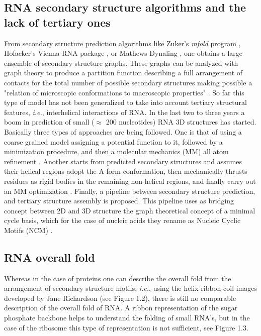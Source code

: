 \subsection{RNA secondary structure algorithms and the lack of
tertiary  ones} From  secondary structure  prediction  algorithms like
Zuker's \textit{mfold} program \cite{zuker2003}, Hofacker's Vienna RNA
package  \cite{hofacker1994}, or Mathews  Dynaling \cite{mathews2002},
one  obtains a large  ensemble of  secondary structure  graphs.  These
graphs  can be  analyzed  with  graph theory  to  produce a  partition
function  describing a  full  arrangement of  contacts  for the  total
number of possible secondary structures making possible a "relation of
microscopic      conformations     to      macroscopic     properties"
\cite{chen2000}. So far this type of model has not been generalized to
take  into   account  tertiary  structural   features,  \textit{i.e.},
interhelical interactions of RNA.
In the  last two to  three years a
boom  in  prediction  of  small  ($\approx$  200  nucleotides)  RNA  3D
structures has started. Basically  three types of approaches are being
followed.  One is that  of using  a coarse  grained model  assigning a
potential function  to it, followed  by a minimization  procedure, and
then  a molecular  mechanics (MM)  all atom  refinement \cite{das2007,
  ding2008,  jonikas2009a}. Another  starts  from predicted  secondary
structures  and  assumes  their   helical  regions  adopt  the  A-form
conformation, then mechanically thrusts residues as rigid bodies in the
remaining non-helical regions, and finally carry out an MM optimization
\cite{martinez2008}.  Finally,  a pipeline between  secondary structure
prediction, and tertiary structure assembly is proposed. This pipeline
uses  as  bridging concept  between  2D  and  3D structure  the  graph
theoretical concept  of a minimal cycle  basis, which for  the case of
nucleic acids they rename as Nucleic Cyclic Motifs (NCM) \cite{parisien2008}.

\subsection{RNA overall fold}
Whereas in the case of proteins one can describe the overall fold from
the  arrangement of secondary  structure motifs,  \textit{i.e.}, using
the   helix-ribbon-coil   images    developed   by   Jane   Richardson
\cite{richardson2000} (see  Figure 1.2), there is  still no comparable
description of the overall fold of RNA. A ribbon representation of the
sugar  phosphate backbone  helps to  understand the  folding  of small
RNA's, but in the case of  the ribosome this type of representation is
not sufficient, see Figure 1.3.

